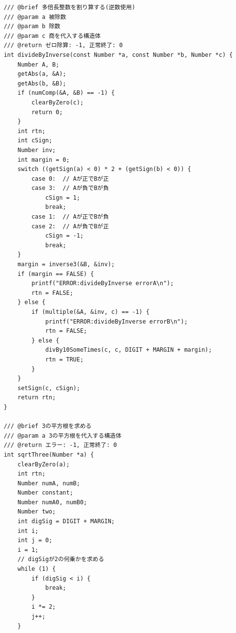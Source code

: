 \documentclass[a4paper,11pt,dvipdfmx]{jsarticle}
\begin{document}
\begin{lstlisting}
    /// @brief 多倍長整数を割り算する(逆数使用)
    /// @param a 被除数
    /// @param b 除数
    /// @param c 商を代入する構造体
    /// @return ゼロ除算: -1, 正常終了: 0
    int divideByInverse(const Number *a, const Number *b, Number *c) {
        Number A, B;
        getAbs(a, &A);
        getAbs(b, &B);
        if (numComp(&A, &B) == -1) {
            clearByZero(c);
            return 0;
        }
        int rtn;
        int cSign;
        Number inv;
        int margin = 0;
        switch ((getSign(a) < 0) * 2 + (getSign(b) < 0)) {
            case 0:  // Aが正でBが正
            case 3:  // Aが負でBが負
                cSign = 1;
                break;
            case 1:  // Aが正でBが負
            case 2:  // Aが負でBが正
                cSign = -1;
                break;
        }
        margin = inverse3(&B, &inv);
        if (margin == FALSE) {
            printf("ERROR:divideByInverse errorA\n");
            rtn = FALSE;
        } else {
            if (multiple(&A, &inv, c) == -1) {
                printf("ERROR:divideByInverse errorB\n");
                rtn = FALSE;
            } else {
                divBy10SomeTimes(c, c, DIGIT + MARGIN + margin);
                rtn = TRUE;
            }
        }
        setSign(c, cSign);
        return rtn;
    }
    
    /// @brief 3の平方根を求める
    /// @param a 3の平方根を代入する構造体
    /// @return エラー: -1, 正常終了: 0
    int sqrtThree(Number *a) {
        clearByZero(a);
        int rtn;
        Number numA, numB;
        Number constant;
        Number numA0, numB0;
        Number two;
        int digSig = DIGIT + MARGIN;
        int i;
        int j = 0;
        i = 1;
        // digSigが2の何乗かを求める
        while (1) {
            if (digSig < i) {
                break;
            }
            i *= 2;
            j++;
        }
    

\end{lstlisting}
\end{document}
